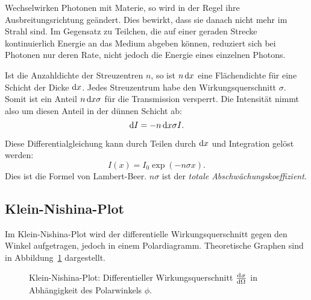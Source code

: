 \documentclass[11pt, ngerman, fleqn, DIV=15, headinclude, BCOR=2cm]{scrreprt}
\begin{document}
Wechselwirken Photonen mit Materie, so wird in der Regel ihre
Ausbreitungsrichtung geändert. Dies bewirkt, dass sie danach nicht mehr im
Strahl sind. Im Gegensatz zu Teilchen, die auf einer geraden Strecke
kontinuierlich Energie an das Medium abgeben können, reduziert sich bei
Photonen nur deren Rate, nicht jedoch die Energie eines einzelnen Photons.

Ist die Anzahldichte der Streuzentren $n$, so ist $n \dif x$ eine Flächendichte
für eine Schicht der Dicke $\dif x$. Jedes Streuzentrum habe den
Wirkungsquerschnitt $\sigma$. Somit ist ein Anteil $n \dif x \sigma$ für die
Transmission versperrt. Die Intensität nimmt also um diesen Anteil in der
dünnen Schicht ab:
\[
    \dif I = - n \dif x \sigma I.
\]

Diese Differentialgleichung kann durch Teilen durch $\dif x$ und Integration
gelöst werden:
\[
    I(x) = I_0 \exp(- n \sigma x).
\]
Dies ist die Formel von Lambert-Beer. $n \sigma$ ist der \emph{totale
Abschwächungskoeffizient}.

\subsection{Klein-Nishina-Plot}

Im Klein-Nishina-Plot wird der differentielle Wirkungsquerschnitt gegen den
Winkel aufgetragen, jedoch in einem Polardiagramm. Theoretische Graphen sind in
Abbildung~\ref{fig:nishina-theo} dargestellt.

\begin{figure}[htbp]
    \centering
    \caption{%
        Klein-Nishina-Plot: Differentieller Wirkungsquerschnitt
        $\od\sigma\Omega$ in Abhängigkeit des Polarwinkels $\phi$.
    }
    \label{fig:nishina-theo}
\end{figure}
\end{document}
